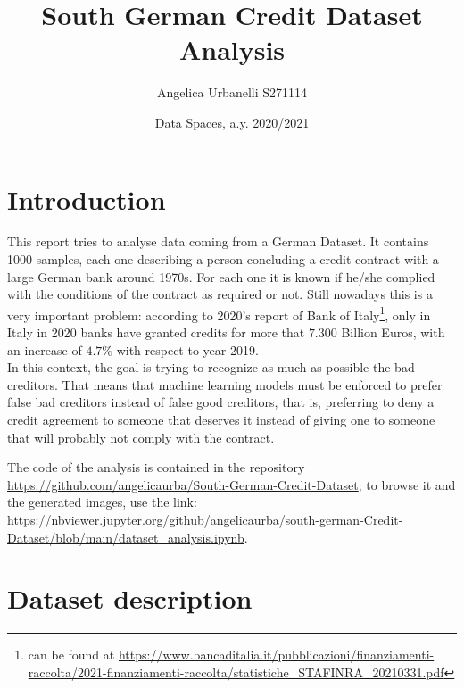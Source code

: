 \documentclass[letterpaper]{article}
\begin{document}
	\title{South German Credit Dataset Analysis}
	\author{Angelica Urbanelli S271114}
	\date{Data Spaces, a.y. 2020/2021}
	\maketitle
	
	\tableofcontents
	
	\newpage 
	\section{Introduction}
	This report tries to analyse data coming from a German Dataset. It contains 1000 samples, each one describing a person concluding a credit contract with a large German bank around 1970s. For each one it is known if he/she complied with the conditions of	the contract as required or not. Still nowadays this is a very important problem: according to 2020's report of Bank of Italy\footnote{can be found at \url{https://www.bancaditalia.it/pubblicazioni/finanziamenti-raccolta/2021-finanziamenti-raccolta/statistiche_STAFINRA_20210331.pdf}}, only in Italy in 2020 banks have granted credits for more that $7.300$ Billion Euros, with an increase of $4.7\%$ with respect to year 2019.\\
	In this context, the goal is trying to recognize as much as possible the bad creditors. That means that machine learning models must be enforced to prefer false bad creditors instead of false good creditors, that is, preferring to deny a credit agreement to someone that deserves it instead of giving one to someone that will probably not comply with the contract.
	\par The code of the analysis is contained in the repository \url{https://github.com/angelicaurba/South-German-Credit-Dataset}; to browse it and the generated images, use the link: \url{https://nbviewer.jupyter.org/github/angelicaurba/south-german-Credit-Dataset/blob/main/dataset_analysis.ipynb}.	
	\section{Dataset description}
\end{document}
